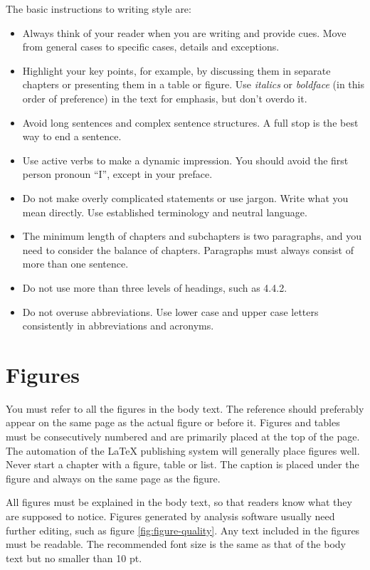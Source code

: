 \documentclass[twoside,draftfooter]{tutthesis} %
\begin{document}
The basic instructions to writing style are:
\begin{itemize} %
  \item Always think of your reader when you are writing and provide cues. Move from general cases to specific cases, details and exceptions.
  \item Highlight your key points, for example, by discussing them in separate chapters or presenting them in a table or figure. Use \emph{italics} or \emph{boldface} (in this order of preference) in the text for emphasis, but don’t overdo it.
  \item Avoid long sentences and complex sentence structures. A full stop is the best way to end a sentence.
  \item Use active verbs to make a dynamic impression. You should avoid the first person pronoun ``I'', except in your preface.
  \item Do not make overly complicated statements or use jargon. Write what you mean directly. Use established terminology and neutral language.
  \item The minimum length of chapters and subchapters is two paragraphs, and you need to consider the balance of chapters.  Paragraphs must always consist of more than one sentence.
  \item Do not use more than three levels of headings, such as 4.4.2.
  \item Do not overuse abbreviations. Use lower case and upper case letters consistently in abbreviations and acronyms.
\end{itemize}

\section{Figures}

You must refer to all the figures in the body text.
The reference should preferably appear on the same page as the actual figure or before it.
Figures and tables must be consecutively numbered and are primarily placed at the top of the page.
The automation of the LaTeX publishing system will generally place figures well.
Never start a chapter with a figure, table or list.
The caption is placed under the figure and always on the same page as the figure.

All figures must be explained in the body text, so that readers know what they are supposed to notice.
Figures generated by analysis software usually need further editing, such as figure \ref{fig:figure-quality}.
Any text included in the figures must be readable.
The recommended font size is the same as that of the body text but no smaller than 10 pt.
\end{document}
